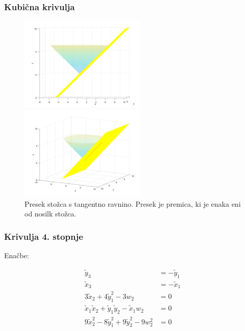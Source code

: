 \documentclass[a4paper, 12pt]{beamer}
\theoremstyle{definition}
\theoremstyle{plain}
\begin{document}
    

\begin{frame}
    \frametitle{Kubična krivulja}
    
    \begin{figure}[ht!]
        \begin{minipage}{0.5\textwidth}
            \centering
            \includegraphics[width=60mm]{stozec_tang_1.png}
        \end{minipage}\hfill
        \begin{minipage}{0.5\textwidth}
            \centering
            \includegraphics[width=60mm]{stozec_tang_2.png}
        \end{minipage}\hfill
        \caption{Presek stožca s tangentno ravnino. Presek je premica, ki je enaka eni od nosilk stožca.}
    \end{figure}

    
\end{frame}
    
    

\begin{frame}
\frametitle{Krivulja 4. stopnje}
    Enačbe:

        \begin{align*}
            \tilde{y}_3 &=- \tilde{y}_1 \\
            \tilde{x}_3 &= - \tilde{x}_1 \\
            3\tilde{x}_2 + 4\tilde{y}_1^2 - 3w_2 &= 0 \\
            \tilde{x}_1\tilde{x}_2 + \tilde{y}_1\tilde{y}_2  - \tilde{x}_1w_2 &= 0 \\
            9\tilde{x}_2^2 - 8\tilde{y}_1^2 + 9\tilde{y}_2^2 - 9w_2^2&= 0 
        \end{align*}
    
\end{frame}
    
\end{document}
